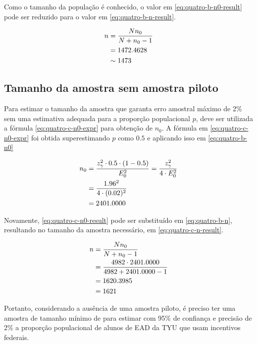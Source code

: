 Como o tamanho da população é conhecido, o valor em \eqref{eq:quatro-b-n0-result} pode ser reduzido para o valor em \eqref{eq:quatro-b-n-result}.

\begin{align}
	n &= \frac{N n_0}{N + n_0 - 1} \nonumber \\
    &= 1472.4628 \nonumber \\
	  &\sim \label{eq:quatro-b-n-result} 
	     1473
\end{align}

\subsection{Tamanho da amostra sem amostra piloto}

Para estimar o tamanho da amostra que garanta erro amostral máximo de 2\% sem uma estimativa adequada para a proporção populacional $p$, deve ser utilizada a fórmula \eqref{eq:quatro-c-n0-expr} para obtenção de $n_0$. A fórmula em \eqref{eq:quatro-c-n0-expr} foi obtida superestimando $p$ como $0.5$ e aplicando isso em \eqref{eq:quatro-b-n0}

\begin{align}
	n_0 &= \label{eq:quatro-c-n0-expr}
	       \frac{z_\gamma^2 \cdot 0.5 \cdot (1 - 0.5)}{E_0^2} = \frac{z_\gamma^2}{4 \cdot E_0^2} \\
	    &= \frac{1.96^2}{4 \cdot (0.02)^2} \nonumber \\
	    &= \label{eq:quatro-c-n0-result}
	       2401.0000
\end{align}

Novamente, \eqref{eq:quatro-c-n0-result} pode ser substituído em \eqref{eq:quatro-b-n}, resultando no tamanho da amostra necessário, em \eqref{eq:quatro-c-n-result}.

\begin{align}
	n &= \frac{N n_0}{N + n_0 - 1} \nonumber \\
	  &= \frac{4982 \cdot 2401.0000}{4982 + 2401.0000 - 1} \nonumber \\
	  &= 1620.3985 \nonumber \\
	  &= \label{eq:quatro-c-n-result} 
	     1621
\end{align}

Portanto, considerando a ausência de uma amostra piloto, é preciso ter uma amostra de tamanho mínimo de \QUATROCnceil para estimar com 95\% de confiança e precisão de 2\% a proporção populacional de alunos de EAD da TYU que usam incentivos federais.